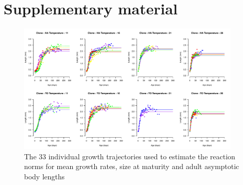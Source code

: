 \newpage
\section{Supplementary material}

\begin{figure}[!ht] %
\centering
\includegraphics[width=0.95\textwidth]{5_ChapExp3/fig/FigS1}
\caption[Individual growth trajectories]{
The 33 individual growth trajectories used to estimate the reaction norms for mean growth rates, size at maturity and adult asymptotic body lengths}
\label{Fig5-S1}
\end{figure}


